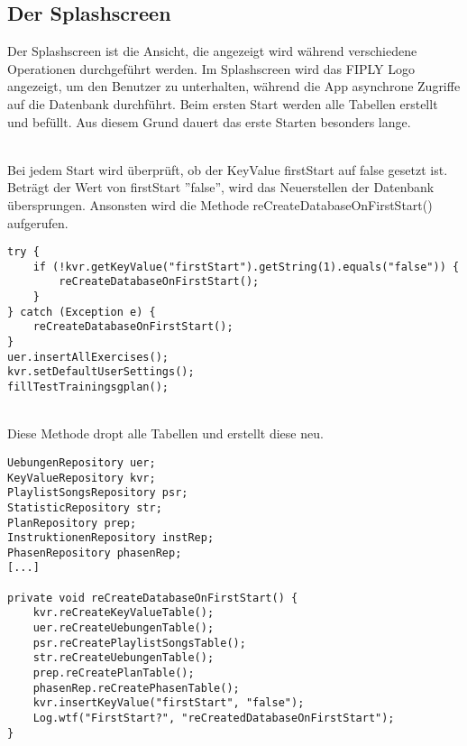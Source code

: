 \documentclass[FIPLY_base.tex]{subfiles}
\begin{document}
\subsection{Der Splashscreen}
Der Splashscreen ist die Ansicht, die angezeigt wird während verschiedene Operationen durchgeführt werden.
Im Splashscreen wird das FIPLY Logo angezeigt, um den Benutzer zu unterhalten, 
während die App asynchrone Zugriffe auf die Datenbank durchführt.
Beim ersten Start werden alle Tabellen erstellt und befüllt.
Aus diesem Grund dauert das erste Starten besonders lange.

\ \\
Bei jedem Start wird überprüft, ob der KeyValue firstStart auf false gesetzt ist.
Beträgt der Wert von firstStart ''false'', wird das Neuerstellen der Datenbank übersprungen.
Ansonsten wird die Methode reCreateDatabaseOnFirstStart() aufgerufen.
\begin{lstlisting}
try {
	if (!kvr.getKeyValue("firstStart").getString(1).equals("false")) {
		reCreateDatabaseOnFirstStart();
	}
} catch (Exception e) {
	reCreateDatabaseOnFirstStart();
}
uer.insertAllExercises();
kvr.setDefaultUserSettings();
fillTestTrainingsgplan();
\end{lstlisting}

\ \\
Diese Methode dropt alle Tabellen und erstellt diese neu.
\begin{lstlisting}
UebungenRepository uer;
KeyValueRepository kvr;
PlaylistSongsRepository psr;
StatisticRepository str;
PlanRepository prep;
InstruktionenRepository instRep;
PhasenRepository phasenRep;
[...]

private void reCreateDatabaseOnFirstStart() {
	kvr.reCreateKeyValueTable();
	uer.reCreateUebungenTable();
	psr.reCreatePlaylistSongsTable();
	str.reCreateUebungenTable();
	prep.reCreatePlanTable();
	phasenRep.reCreatePhasenTable();
	kvr.insertKeyValue("firstStart", "false");
	Log.wtf("FirstStart?", "reCreatedDatabaseOnFirstStart");
}
\end{lstlisting}
\end{document}
